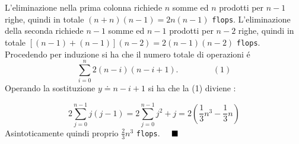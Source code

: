 L'eliminazione nella prima colonna richiede $n$ somme ed $n$ prodotti per $n-1$ righe, quindi in totale $(n+n)(n-1) = 2n(n-1)$ \texttt{flops}. L'eliminazione della seconda richiede $n-1$ somme ed $n-1$ prodotti per $n-2$ righe, quindi in totale $[(n-1)+(n-1)](n-2) = 2(n-1)(n-2)$ \texttt{flops}.\\
Procedendo per induzione si ha che il numero totale di operazioni \'e
\[
\sum_{i=0}^{n} 2(n-i)(n-i+1). \hspace{50pt} (1)
\]
Operando la sostituzione $y \doteq n-i+1$ si ha che la (1) diviene :

\[
2 \sum_{j=0}^{n-1} j(j-1) = 2 \sum_{j=0}^{n-1}j^2 + j = 2 ( \frac{1}{3}n^3 - \frac{1}{3}n)
\]
Asintoticamente quindi proprio $\frac{2}{3}n^3$ \texttt{flops}.
$\hspace{1em}\blacksquare$
